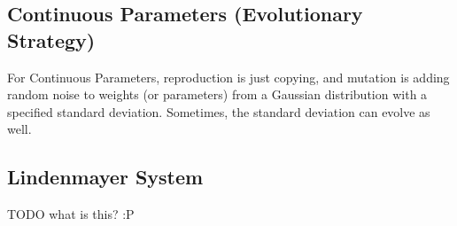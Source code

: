 \subsection{Continuous Parameters (Evolutionary Strategy)}
For Continuous Parameters, reproduction is just copying, and mutation is adding
random noise to weights (or parameters) from a Gaussian distribution with a
specified standard deviation. Sometimes, the standard deviation can evolve as
well.

\subsection{Lindenmayer System}
TODO what is this? :P
